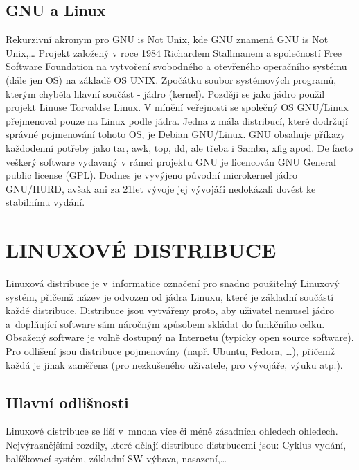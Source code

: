 \documentclass[a4paper,12pt]{article}
\newcommand{\upc}[1]{\uppercase{#1}} %
\begin{document}
\subsection{GNU a Linux} 
Rekurzivní akronym pro GNU is Not Unix, kde GNU znamená GNU is Not Unix,…
Projekt založený v roce 1984 Richardem Stallmanem a společností Free Software Foundation na vytvoření svobodného a otevřeného operačního systému (dále jen OS) na základě OS UNIX. Zpočátku soubor systémových programů, kterým chyběla hlavní součást - jádro (kernel). Později se jako jádro použil projekt Linuse Torvaldse Linux. V mínění veřejnosti se společný OS GNU/Linux přejmenoval pouze na Linux podle jádra. Jedna z mála distribucí, které dodržují správné pojmenování tohoto OS, je Debian GNU/Linux.
GNU obsahuje příkazy každodenní potřeby jako tar, awk, top, dd, ale třeba i Samba, xfig apod. De facto veškerý software vydavaný v rámci projektu GNU je licencován GNU General public license (GPL). Dodnes je vyvýjeno původní microkernel jádro GNU/HURD, avšak ani za 21let vývoje jej vývojáři nedokázali dovést ke stabilnímu vydání.~\cite{GNUABCLinuxu}~\cite{GNUweb}~\cite{ROOT_HURD}


\section{\upc{Linuxové distribuce}}
Linuxová distribuce je v~informatice označení pro snadno použitelný Linuxový systém, přičemž název je odvozen od jádra Linuxu, které je základní součástí každé distribuce. Distribuce jsou vytvářeny proto, aby uživatel nemusel jádro a~doplňující software sám náročným způsobem skládat do funkčního celku. Obsažený software je volně dostupný na Internetu (typicky open source software). Pro odlišení jsou distribuce pojmenovány (např. Ubuntu, Fedora, …), přičemž každá je jinak zaměřena (pro nezkušeného uživatele, pro vývojáře, výuku atp.).\cite{WDIST}

\subsection{Hlavní odlišnosti}
Linuxové distribuce se liší v~mnoha více či méně zásadních ohledech ohledech. Nejvýraznějšími rozdíly, které dělají distribuce distrbucemi jsou: Cyklus vydání, balíčkovací systém, základní SW výbava, nasazení,…
\end{document}
